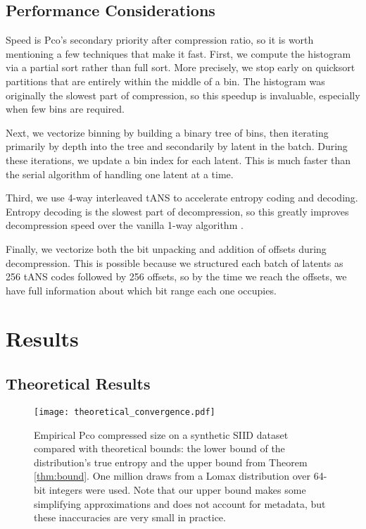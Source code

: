 \documentclass[letterpaper]{article}
\begin{document}
\subsection{Performance Considerations}

Speed is Pco's secondary priority after compression ratio, so it is worth mentioning a few techniques that make it fast. First, we compute the histogram via a partial sort rather than full sort.
More precisely, we stop early on quicksort partitions that are entirely within the middle of a bin.
The histogram was originally the slowest part of compression, so this speedup is invaluable, especially when few bins are required.

Next, we vectorize binning by building a binary tree of bins, then iterating primarily by depth into the tree and secondarily by latent in the batch.
During these iterations, we update a bin index for each latent.
This is much faster than the serial algorithm of handling one latent at a time.

Third, we use 4-way interleaved tANS to accelerate entropy coding and decoding.
Entropy decoding is the slowest part of decompression, so this greatly improves decompression speed over the vanilla 1-way algorithm \cite{interleaved_entropy}.

Finally, we vectorize both the bit unpacking and addition of offsets during decompression.
This is possible because we structured each batch of latents as 256 tANS codes followed by 256 offsets, so by the time we reach the offsets, we have full information about which bit range each one occupies.

\section{Results}

\subsection{Theoretical Results}
\label{sec:theoretical_results}

\begin{wrapfigure}{r}{0.5\textwidth}
\texttt{[image: theoretical\_convergence.pdf]}
\caption{
  Empirical Pco compressed size on a synthetic SIID dataset compared with theoretical bounds: the lower bound of the distribution's true entropy and the upper bound from Theorem \ref{thm:bound}.
  One million draws from a Lomax distribution over 64-bit integers were used.
  Note that our upper bound makes some simplifying approximations and does not account for metadata, but these inaccuracies are very small in practice.
}
\label{fig:theoretical_convergence}
\end{wrapfigure}
\end{document}
